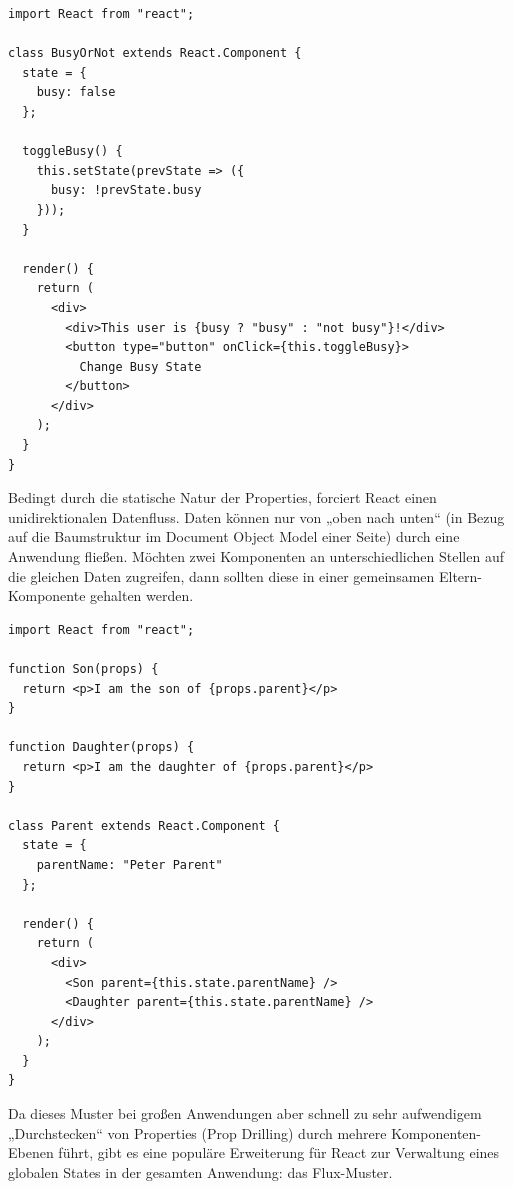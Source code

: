 \begin{minipage}{\linewidth}
\begin{lstlisting}[caption={Jede Komponente kann über einen modifizierbaren state verfügen.}]
import React from "react";

class BusyOrNot extends React.Component {
  state = {
    busy: false
  };

  toggleBusy() {
    this.setState(prevState => ({
      busy: !prevState.busy
    }));
  }

  render() {
    return (
      <div>
        <div>This user is {busy ? "busy" : "not busy"}!</div>
        <button type="button" onClick={this.toggleBusy}>
          Change Busy State
        </button>
      </div>
    );
  }
}
\end{lstlisting}
\end{minipage}

Bedingt durch die statische Natur der Properties, forciert React einen unidirektionalen Datenfluss. Daten können nur von „oben nach unten“ (in Bezug auf die Baumstruktur im Document Object Model einer Seite) durch eine Anwendung fließen. Möchten zwei Komponenten an unterschiedlichen Stellen auf die gleichen Daten zugreifen, dann sollten diese in einer gemeinsamen Eltern-Komponente gehalten werden. \newline

\begin{minipage}{\linewidth}
\begin{lstlisting}[caption={„Lifting state up“: Mehrere Komponenten greifen auf die gleichen Daten zu.}]
import React from "react";

function Son(props) {
  return <p>I am the son of {props.parent}</p>
}

function Daughter(props) {
  return <p>I am the daughter of {props.parent}</p>
}

class Parent extends React.Component {
  state = {
    parentName: "Peter Parent"
  };

  render() {
    return (
      <div>
        <Son parent={this.state.parentName} />
        <Daughter parent={this.state.parentName} />
      </div>
    );
  }
}
\end{lstlisting}
\end{minipage}

Da dieses Muster bei großen Anwendungen aber schnell zu sehr aufwendigem „Durchstecken“ von Properties (Prop Drilling) durch mehrere Komponenten-Ebenen führt, gibt es eine populäre Erweiterung für React zur Verwaltung eines globalen States in der gesamten Anwendung: das Flux-Muster.


